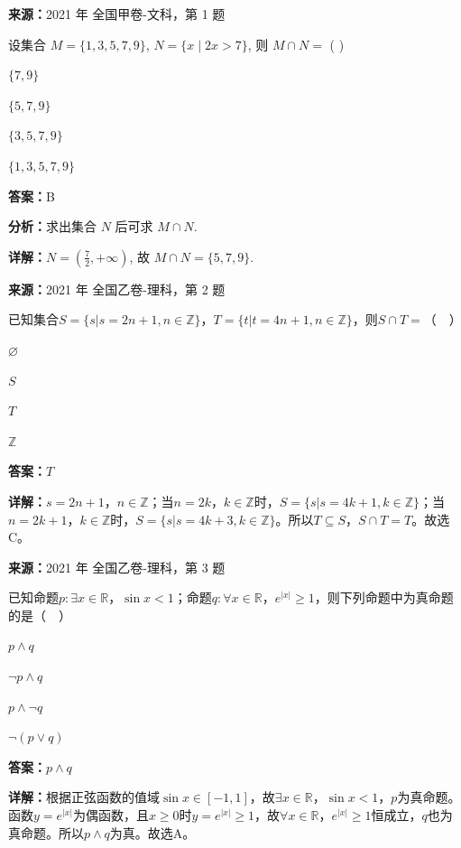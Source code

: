 \begin{question}[points=5]
\textbf{来源：}2021 年 全国甲卷-文科，第 1 题\par
设集合 $M = \{1,3,5,7,9\}$, $N = \{x \mid 2x > 7\}$, 则 $M \cap N =$ ( )
\begin{choices}
  \item $\{7,9\}$
  \item $\{5,7,9\}$
  \item $\{3,5,7,9\}$
  \item $\{1,3,5,7,9\}$
\end{choices}
\begin{solution}
\textbf{答案：}B

\textbf{分析：}求出集合 $N$ 后可求 $M \cap N$.

\textbf{详解：}$N = \left(\frac{7}{2}, +\infty\right)$, 故 $M \cap N = \{5,7,9\}$.
\end{solution}
\end{question}

\begin{question}[points=5]
\textbf{来源：}2021 年 全国乙卷-理科，第 2 题\par
已知集合$S=\{s|s=2n+1,n\in\mathbb{Z}\}$，$T=\{t|t=4n+1,n\in\mathbb{Z}\}$，则$S\cap T=$（  ）
\begin{choices}
  \item $\varnothing$
  \item $S$
  \item $T$
  \item $\mathbb{Z}$
\end{choices}
\begin{solution}
\textbf{答案：}$T$

\textbf{详解：}$s=2n+1$，$n\in\mathbb{Z}$；当$n=2k$，$k\in\mathbb{Z}$时，$S=\{s|s=4k+1,k\in\mathbb{Z}\}$；当$n=2k+1$，$k\in\mathbb{Z}$时，$S=\{s|s=4k+3,k\in\mathbb{Z}\}$。所以$T\subseteq S$，$S\cap T=T$。故选C。
\end{solution}
\end{question}

\begin{question}[points=5]
\textbf{来源：}2021 年 全国乙卷-理科，第 3 题\par
已知命题$p:\exists x\in\mathbb{R}$，$\sin x<1$；命题$q:\forall x\in\mathbb{R}$，$e^{|x|}\geq 1$，则下列命题中为真命题的是（  ）
\begin{choices}
  \item $p\land q$
  \item $\lnot p\land q$
  \item $p\land \lnot q$
  \item $\lnot(p\lor q)$
\end{choices}
\begin{solution}
\textbf{答案：}$p\land q$

\textbf{详解：}根据正弦函数的值域$\sin x\in[-1,1]$，故$\exists x\in\mathbb{R}$，$\sin x<1$，$p$为真命题。函数$y=e^{|x|}$为偶函数，且$x\geq 0$时$y=e^{|x|}\geq 1$，故$\forall x\in\mathbb{R}$，$e^{|x|}\geq 1$恒成立，$q$也为真命题。所以$p\land q$为真。故选A。
\end{solution}
\end{question}

